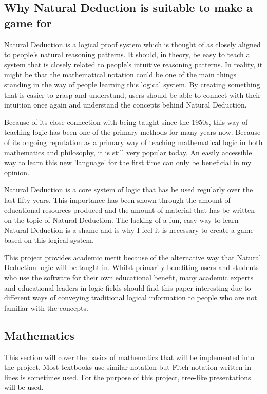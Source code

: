 \documentclass[a4paper]{article}
\begin{document}
\subsection{Why Natural Deduction is suitable to make a game for}

Natural Deduction is a logical proof system which is thought of as closely aligned to people's natural reasoning patterns. \cite{arthur2011natural} It should, in theory, be easy to teach a system that is closely related to people's intuitive reasoning patterns. In reality, it might be that the mathematical notation could be one of the main things standing in the way of people learning this logical system. By creating something that is easier to grasp and understand, users should be able to connect with their intuition once again and understand the concepts behind Natural Deduction.  

Because of its close connection with being taught since the 1950s, this way of teaching logic has been one of the primary methods for many years now. Because of its ongoing reputation as a primary way of teaching mathematical logic in both mathematics and philosophy, it is still very popular today. An easily accessible way to learn this new 'language' for the first time can only be beneficial in my opinion.

Natural Deduction is a core system of logic that has be used regularly over the last fifty years. This importance has been shown through the amount of educational resources produced and the amount of material that has be written on the topic of Natural Deduction. The lacking of a fun, easy way to learn Natural Deduction is a shame and is why I feel it is necessary to create a game based on this logical system.

This project provides academic merit because of the alternative way that Natural Deduction logic will be taught in. Whilst primarily benefiting users and students who use the software for their own educational benefit, many academic experts and educational leaders in logic fields should find this paper interesting due to different ways of conveying traditional logical information to people who are not familiar with the concepts. 

\subsection{Mathematics}

This section will cover the basics of mathematics that will be implemented into the project. Most textbooks use similar notation but Fitch notation written in lines is sometimes used. For the purpose of this project, tree-like presentations will be used. 
\end{document}
